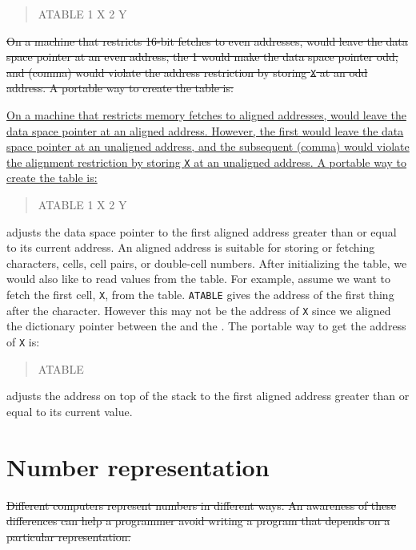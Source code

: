 \begin{quote}\ttfamily
	 ATABLE 1  X \word{,} 2  Y \word{,}
\end{quote}

\sout{On a machine that restricts 16-bit fetches to even addresses,
 would leave the data space pointer at an even address,
the 1  would make the data space pointer odd, and \word{,}
(comma) would violate the address restriction by storing \texttt{X}
at an odd address. A portable way to create the table is:}

\uline{%
On a machine that restricts memory fetches to aligned addresses,
 would leave the data space pointer at an aligned address.
However, the first  would leave the data space pointer at an
unaligned address,  and the subsequent \word{,} (comma) would violate
the alignment restriction by storing \texttt{X} at an unaligned address.
A portable way to create the table is:}

\begin{quote}\ttfamily
	 ATABLE 1 
		 X \word{,} 2   Y \word{,}
\end{quote}

 adjusts the data space pointer to the first aligned
address greater than or equal to its current address. An aligned
address is suitable for storing or fetching characters, cells, cell
pairs, or double-cell numbers.
%
After initializing the table, we would also like to read values from
the table. For example, assume we want to fetch the first cell,
\texttt{X}, from the table. \texttt{ATABLE}  gives the
address of the first thing after the character. However this may not
be the address of \texttt{X} since we aligned the dictionary pointer
between the  and the \word{,}. The portable way to get the
address of \texttt{X} is:
\begin{quote}\ttfamily
	ATABLE  
\end{quote}
 adjusts the address on top of the stack to the first
aligned address greater than or equal to its current value.


\section{Number representation} %

\sout{%
Different computers represent numbers in different ways. An awareness
of these differences can help a programmer avoid writing a program
that depends on a particular representation.}


